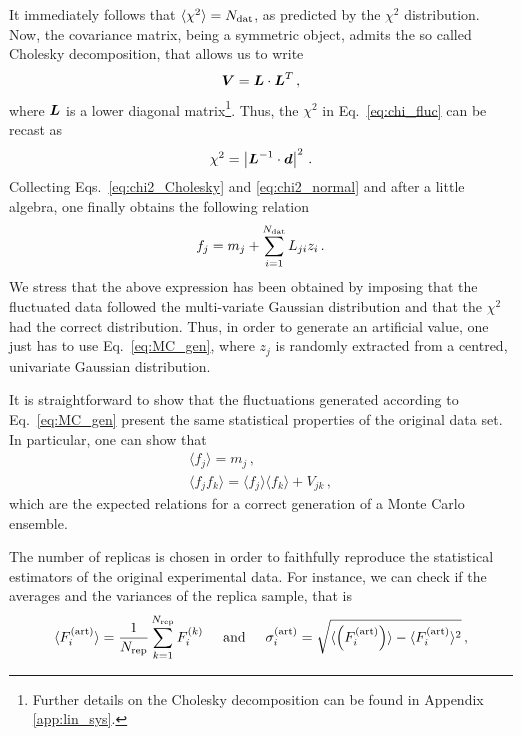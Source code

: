 It immediately follows that $\langle \chi^2 \rangle = N_{\textrm{dat}}$, as predicted by the $\chi^2$ distribution. Now, the covariance matrix, being a symmetric object, admits the so called Cholesky decomposition, that allows us to write
\begin{equation}
  \vb*{V} = \vb*{L} \cdot {\vb*{L}}^{T} \,,
\end{equation}
where $\vb*{L}$ is a lower diagonal matrix\footnote{Further details on the Cholesky decomposition can be found in Appendix \ref{app:lin_sys}.}. Thus, the $\chi^2$ in Eq.~\eqref{eq:chi_fluc} can be recast as
\begin{equation}
  \chi^2 = \left| \vb*{L}^{-1} \cdot \vb*{d} \right|^2 \,.
  \label{eq:chi2_Cholesky}
\end{equation}
Collecting Eqs.~\eqref{eq:chi2_Cholesky} and \eqref{eq:chi2_normal} and after a little algebra, one finally obtains the following relation
\begin{equation}
  f_j = m_j + \sum_{i=1}^{N_{\textrm{dat}}} L_{ji} z_i\,.
  \label{eq:MC_gen}
\end{equation}
We stress that the above expression has been obtained by imposing that the fluctuated data followed the multi-variate Gaussian distribution and that the $\chi^2$ had the correct distribution. Thus, in order to generate an artificial value, one just has to use Eq.~\eqref{eq:MC_gen}, where $z_j$ is randomly extracted from a centred, univariate Gaussian distribution.\par
It is straightforward to show that the fluctuations generated according to Eq.~\eqref{eq:MC_gen} present the same statistical properties of the original data set. In particular, one can show that
\begin{gather}
  \langle f_j \rangle = m_j \,,\\
  \langle f_j f_k \rangle = \langle f_j \rangle \langle f_k \rangle + V_{jk} \,,
\end{gather}
which are the expected relations for a correct generation of a Monte Carlo ensemble.\par
The number of replicas is chosen in order to faithfully reproduce the statistical estimators of the original experimental data. For instance, we can check if the averages and the variances of the replica sample, that is
\begin{equation}
  \langle F_{i}^{\textrm{(art)}} \rangle = \frac{1}{N_{\textrm{rep}}} \sum_{k=1}^{N_{\textrm{rep}}} F_{i}^{(k)} \hspace{5mm} \textrm{and} \hspace*{5mm} \sigma_i^{\textrm{(art)}} = \sqrt{ \langle \left( F_{i}^{\textrm{(art)}} \right) \rangle - \langle F_{i}^{\textrm{(art)}} \rangle^2} \,,
\end{equation}
